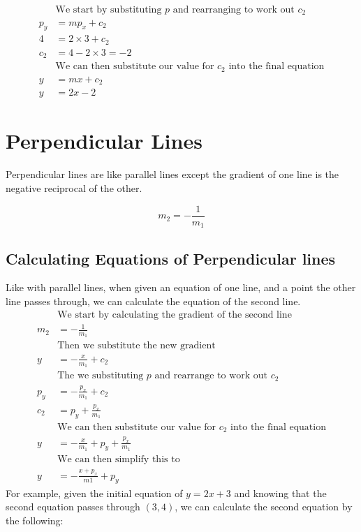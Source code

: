 \documentclass[a4paper]{article}
\begin{document}
\begin{align*}
	&\text{We start by substituting $p$ and rearranging to work out $c_2$}\\
	p_y &= mp_x + c_2 \\
	4 & = 2 \times 3 + c_2 \\
	c_2 &= 4 - 2 \times 3 = -2\\
	&\text{We can then substitute our value for $c_2$ into the final equation}\\
	y &= mx + c_2\\
	y &= 2x -2
\end{align*}
\section{Perpendicular Lines}
Perpendicular lines are like parallel lines except the gradient of one line is the negative reciprocal of the other.

\begin{equation}
	m_2 = -\frac{1}{m_1}
\end{equation}

\subsection{Calculating Equations of Perpendicular lines}
Like with parallel lines, when given an equation of one line, and a point the other line passes through, we can calculate
the equation of the second line.
\begin{align*}
	&\text{We start by calculating the gradient of the second line}\\
	m_2 &= -\frac{1}{m_1}\\
	&\text{Then we substitute the new gradient}\\
	y &= -\frac{x}{m_1} + c_2\\
	&\text{The we substituting $p$ and rearrange to work out $c_2$}\\
	p_y &=  -\frac{p_x}{m_1}+ c_2 \\
	c_2 &= p_y + \frac{p_x}{m_1}\\
	&\text{We can then substitute our value for $c_2$ into the final equation}\\
	y &= -\frac{x}{m_1} + p_y + \frac{p_x}{m_1}\\
	&\text{We can then simplify this to}\\
	y &= -\frac{x + p_x}{m1} + p_y
\end{align*}
For example, given the initial equation of $y = 2x + 3$ and knowing that the second equation passes through $(3, 4)$,
we can calculate the second equation by the following:
\end{document}
